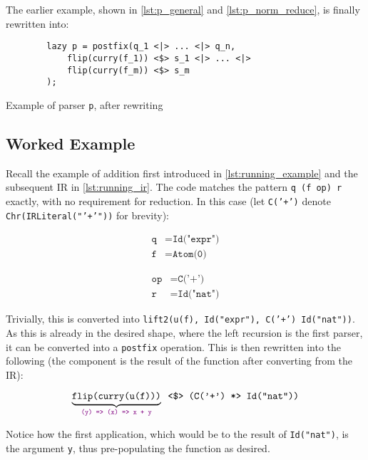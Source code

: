 The earlier example, shown in \autoref{lst:p_general} and \autoref{lst:p_norm_reduce}, is finally rewritten into:
\begin{capminted}
    \begin{verbatim}
        lazy p = postfix(q_1 <|> ... <|> q_n,
            flip(curry(f_1)) <$> s_1 <|> ... <|>
            flip(curry(f_m)) <$> s_m
        );
    \end{verbatim}
    \vspace{-0.5\baselineskip}
    \caption{Example of parser \texttt{p}, after rewriting}
    \label{lst:p_rewrite}
    \vspace{-\baselineskip}
\end{capminted}

\subsection{Worked Example}
\label{ssec:worked_ex}

Recall the example of addition first introduced in \autoref{lst:running_example} and the subsequent IR in \autoref{lst:running_ir}.
The code matches the pattern \texttt{q \pa (f \constfmapl op) \ap r} exactly, with no requirement for reduction.
In this case (let \texttt{C('+')} denote \texttt{Chr(IRLiteral("'+'"))} for brevity):

\begin{center}
    \vspace{-2\baselineskip}
    \begin{minipage}[t]{0.49\textwidth}
        \begin{align*}
            \texttt{q} & = \texttt{Id("expr")} \\
            \texttt{f} & = \texttt{Atom(0)}
        \end{align*}
    \end{minipage}
    \hfill
    \begin{minipage}[t]{0.49\textwidth}
        \begin{align*}
            \texttt{op} & = \texttt{C('+')} \\
            \texttt{r} & = \texttt{Id("nat")}
        \end{align*}
    \end{minipage}
\end{center}

Trivially, this is converted into \texttt{lift2(u(f), Id("expr"), C('+') \apr Id("nat"))}.
As this is already in the desired shape, where the left recursion is the first parser, it can be converted into a \texttt{postfix} operation.
This is then rewritten into the following (the  component is the result of the function after converting from the IR):

$$\underbrace{\texttt{flip(curry(u(f)))}}_{\violet{\texttt{(y) => (x) => x + y}}} \texttt{ \fmap (C('+') \apr Id("nat"))}$$

Notice how the first application, which would be to the result of \texttt{Id("nat")}, is the argument \texttt{y}, thus pre-populating the function as desired.